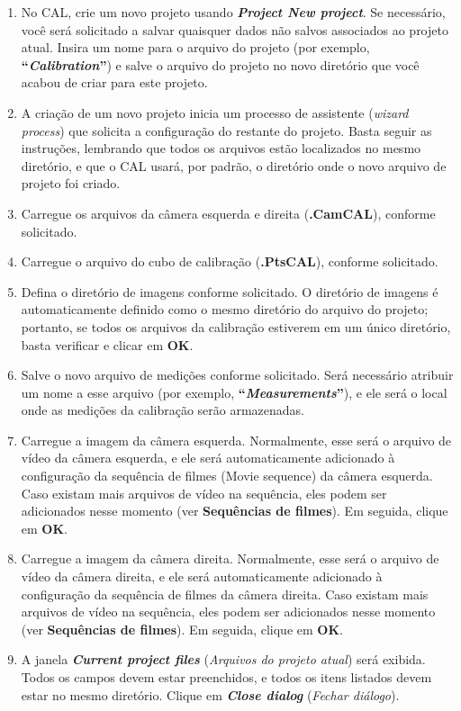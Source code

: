 \documentclass[
  12pt,
  letterpaper,
  DIV=11,
  numbers=noendperiod]{scrreprt}
\begin{document}
\begin{enumerate}
\def\labelenumi{\arabic{enumi}.}
\item
  No CAL, crie um novo projeto usando \textbf{\emph{Project \textbar{}
  New project}}. Se necessário, você será solicitado a salvar quaisquer
  dados não salvos associados ao projeto atual. Insira um nome para o
  arquivo do projeto (por exemplo,
  \textbf{``\textbf{\emph{Calibration}}''}) e salve o arquivo do projeto
  no novo diretório que você acabou de criar para este projeto.
\item
  A criação de um novo projeto inicia um processo de assistente
  (\emph{wizard process}) que solicita a configuração do restante do
  projeto. Basta seguir as instruções, lembrando que todos os arquivos
  estão localizados no mesmo diretório, e que o CAL usará, por padrão, o
  diretório onde o novo arquivo de projeto foi criado.
\item
  Carregue os arquivos da câmera esquerda e direita (\textbf{.CamCAL}),
  conforme solicitado.
\item
  Carregue o arquivo do cubo de calibração (\textbf{.PtsCAL}), conforme
  solicitado.
\item
  Defina o diretório de imagens conforme solicitado. O diretório de
  imagens é automaticamente definido como o mesmo diretório do arquivo
  do projeto; portanto, se todos os arquivos da calibração estiverem em
  um único diretório, basta verificar e clicar em \textbf{OK}.
\item
  Salve o novo arquivo de medições conforme solicitado. Será necessário
  atribuir um nome a esse arquivo (por exemplo,
  \textbf{``\textbf{\emph{Measurements}}''}), e ele será o local onde as
  medições da calibração serão armazenadas.
\item
  Carregue a imagem da câmera esquerda. Normalmente, esse será o arquivo
  de vídeo da câmera esquerda, e ele será automaticamente adicionado à
  configuração da sequência de filmes (Movie sequence) da câmera
  esquerda. Caso existam mais arquivos de vídeo na sequência, eles podem
  ser adicionados nesse momento (ver \textbf{Sequências de filmes}). Em
  seguida, clique em \textbf{OK}.
\item
  Carregue a imagem da câmera direita. Normalmente, esse será o arquivo
  de vídeo da câmera direita, e ele será automaticamente adicionado à
  configuração da sequência de filmes da câmera direita. Caso existam
  mais arquivos de vídeo na sequência, eles podem ser adicionados nesse
  momento (ver \textbf{Sequências de filmes}). Em seguida, clique em
  \textbf{OK}.
\item
  A janela \textbf{\emph{Current project files}} (\emph{Arquivos do
  projeto atual}) será exibida. Todos os campos devem estar preenchidos,
  e todos os itens listados devem estar no mesmo diretório. Clique em
  \textbf{\emph{Close dialog}} (\emph{Fechar diálogo}).
\end{enumerate}
\end{document}
